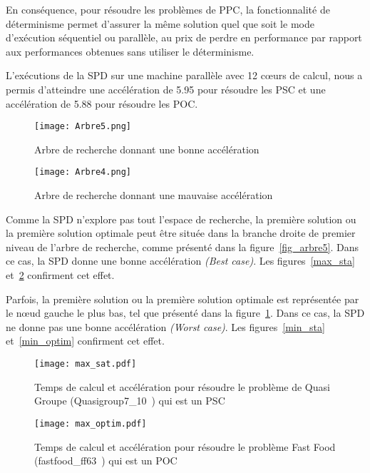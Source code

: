 \documentclass[parallelisme]{compas2014}
\begin{document}
En conséquence, pour résoudre les problèmes de PPC, la fonctionnalité de déterminisme permet d'assurer la même solution quel que soit le mode d'exécution séquentiel ou parallèle, au prix de perdre en performance par rapport aux performances obtenues sans utiliser le déterminisme.

L'exécutions de la SPD sur une machine parallèle avec 12 cœurs de calcul, nous a permis d'atteindre une accélération de 5.95 pour résoudre les PSC et une accélération de 5.88 pour résoudre les POC.

\begin{figure}[htbp]
\begin{minipage}[c]{.45\linewidth}
\begin{center}
 \texttt{[image: Arbre5.png]}
\caption {Arbre de recherche donnant une bonne accélération} \label{fig_arbre5}
\end{center}
\end{minipage}
\hfill
\begin{minipage}[c]{.45\linewidth}
\begin{center}
 \texttt{[image: Arbre4.png]}
\caption {Arbre de recherche donnant une mauvaise accélération} \label{fig_arbre4}
\end{center}
\end{minipage}
\end{figure}

Comme la SPD n'explore pas tout l'espace de recherche, la première solution ou la première solution optimale peut être située dans la branche droite de premier niveau de l'arbre de recherche, comme présenté dans la figure~\ref{fig_arbre5}. Dans ce cas, la SPD donne une bonne accélération \textit{(Best case)}. Les figures~\ref{max_sta} et~\ref{max_optim} confirment cet effet. 

Parfois, la première solution ou la première solution optimale est représentée par le nœud gauche le plus bas, tel que présenté dans la figure~\ref{fig_arbre4}. Dans ce cas, la SPD ne donne pas une bonne accélération \textit{(Worst case)}. Les figures~\ref{min_sta} et~\ref{min_optim} confirment cet effet. 






\begin{figure}[htbp]
\begin{minipage}[c]{.45\linewidth}
\texttt{[image: max\_sat.pdf]}
\caption {Temps de calcul et accélération pour résoudre le problème de Quasi Groupe (Quasigroup7\_10~\cite{ch2012}) qui est un PSC} \label{max_sta}
\end{minipage}
\hfill
\begin{minipage}[c]{.45\linewidth}
\texttt{[image: max\_optim.pdf]}
\caption {Temps de calcul et accélération pour résoudre le problème Fast Food  (fastfood\_ff63~\cite{ch2012}) qui est un POC} \label{max_optim}
\end{minipage}
\end{figure}
\end{document}
